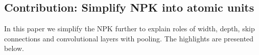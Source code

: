 \subsection{Contribution: Simplify NPK into atomic units}
 In this paper we simplify the NPK further to explain roles of width, depth, skip connections and convolutional layers with pooling. The highlights are presented below.

